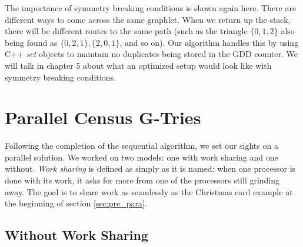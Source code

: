 \documentclass[12pt,twoside]{reedthesis}
\begin{document}
The importance of symmetry breaking conditions is shown again here. There are different ways to come across the same graphlet. When we return up the stack, there will be different routes to the same path (such as the triangle $\{0,1,2\}$ also being found as $\{0,2,1\}, \{2,0,1\}$, and so on). Our algorithm handles this by using C++ \textit{set} objects to maintain no duplicates being stored in the GDD counter. We will talk in chapter 5  about what an optimized setup would look like with symmetry breaking conditions.




	\chapter{Parallel Census G-Tries}
	
Following the completion of the sequential algorithm, we set our sights on a parallel solution. We worked on two models: one with work sharing and one without. \textit{Work sharing} is defined as simply as it is named: when one processor is done with its work, it asks for more from one of the processors still grinding away. The goal is to share work as seamlessly as the Christmas card example at the beginning of section \ref{sec:pre_para}.



\section{Without Work Sharing}
\end{document}

